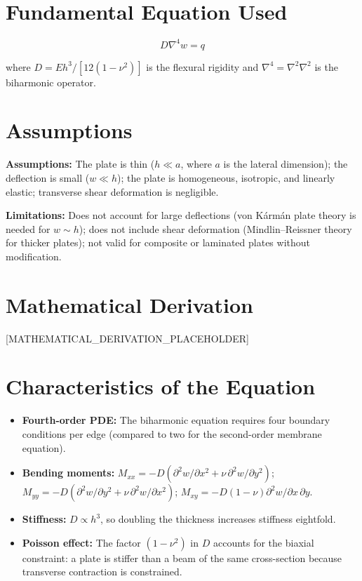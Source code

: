 \documentclass[11pt,openright]{book}
\begin{document}
\section*{Fundamental Equation Used}

\begin{equation}
\boxed{\; D\nabla^{4}w = q\;}
\label{eq:plate}
\end{equation}

where $D = Eh^{3}/[12(1-\nu^{2})]$ is the flexural rigidity and $\nabla^{4} = \nabla^{2}\nabla^{2}$ is the biharmonic operator.
\section*{Assumptions}

\textbf{Assumptions:} The plate is thin ($h \ll a$, where $a$ is the lateral dimension); the deflection is small ($w \ll h$); the plate is homogeneous, isotropic, and linearly elastic; transverse shear deformation is negligible.


\textbf{Limitations:} Does not account for large deflections (von Kármán plate theory is needed for $w \sim h$); does not include shear deformation (Mindlin--Reissner theory for thicker plates); not valid for composite or laminated plates without modification.


\section*{Mathematical Derivation}

[MATHEMATICAL_DERIVATION_PLACEHOLDER]

\section*{Characteristics of the Equation}

\begin{itemize}
  \item \textbf{Fourth-order PDE:} The biharmonic equation requires four boundary conditions per edge (compared to two for the second-order membrane equation).
  \item \textbf{Bending moments:} $M_{xx} = -D(\partial^{2}w/\partial x^{2} + \nu\,\partial^{2}w/\partial y^{2})$; $M_{yy} = -D(\partial^{2}w/\partial y^{2} + \nu\,\partial^{2}w/\partial x^{2})$; $M_{xy} = -D(1-\nu)\partial^{2}w/\partial x\,\partial y$.
  \item \textbf{Stiffness:} $D \propto h^{3}$, so doubling the thickness increases stiffness eightfold.
  \item \textbf{Poisson effect:} The factor $(1-\nu^{2})$ in $D$ accounts for the biaxial constraint: a plate is stiffer than a beam of the same cross-section because transverse contraction is constrained.
\end{itemize}
\end{document}
